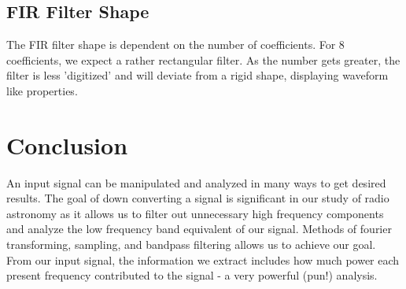 \documentclass[12pt]{article}
\begin{document}
\subsection{FIR Filter Shape}
The FIR filter shape is dependent on the number of coefficients. For 8
coefficients, we expect a rather rectangular filter. As the number gets
greater, the filter is less 'digitized' and will deviate from a rigid
shape, displaying waveform like properties.
\section{Conclusion}
An input signal can be manipulated and analyzed in many ways to get
desired results. The goal of down converting a signal is significant in
our study of radio astronomy as it allows us to filter out unnecessary
high frequency components and analyze the low frequency band equivalent
of our signal. Methods of fourier transforming, sampling, and bandpass
filtering allows us to achieve our goal. From our input signal, the
information we extract includes how much power each present frequency
contributed to the signal - a very powerful (pun!) analysis.
\end{document}
